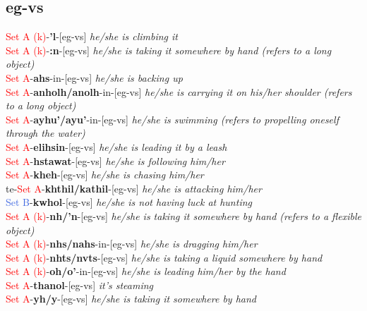 \documentclass[oneside,openany]{book}%
\begin{document}
\subsection*{eg-vs}%
\textcolor{Red}{Set A (k)}{-}\textbf{'l}{-}[eg-vs] \textit{ he/she is climbing it} \\%
\textcolor{Red}{Set A (k)}{-}\textbf{:n}{-}[eg-vs] \textit{ he/she is taking it somewhere by hand (refers to a long object)} \\%
\textcolor{Red}{Set A}{-}\textbf{ahs}{-}in{-}[eg-vs] \textit{ he/she is backing up} \\%
\textcolor{Red}{Set A}{-}\textbf{anholh/anolh}{-}in{-}[eg-vs] \textit{ he/she is carrying it on his/her shoulder (refers to a long object)} \\%
\textcolor{Red}{Set A}{-}\textbf{ayhu'/ayu'}{-}in{-}[eg-vs] \textit{ he/she is swimming (refers to propelling oneself through the water)} \\%
\textcolor{Red}{Set A}{-}\textbf{elihsin}{-}[eg-vs] \textit{ he/she is leading it by a leash} \\%
\textcolor{Red}{Set A}{-}\textbf{hstawat}{-}[eg-vs] \textit{ he/she is following him/her} \\%
\textcolor{Red}{Set A}{-}\textbf{kheh}{-}[eg-vs] \textit{ he/she is chasing him/her} \\%
te{-}\textcolor{Red}{Set A}{-}\textbf{khthil/kathil}{-}[eg-vs] \textit{ he/she is attacking him/her} \\%
\textcolor{RoyalBlue}{Set B}{-}\textbf{kwhol}{-}[eg-vs] \textit{ he/she is not having luck at hunting} \\%
\textcolor{Red}{Set A (k)}{-}\textbf{nh/'n}{-}[eg-vs] \textit{ he/she is taking it somewhere by hand (refers to a flexible object)} \\%
\textcolor{Red}{Set A (k)}{-}\textbf{nhs/nahs}{-}in{-}[eg-vs] \textit{ he/she is dragging him/her} \\%
\textcolor{Red}{Set A (k)}{-}\textbf{nhts/nvts}{-}[eg-vs] \textit{ he/she is taking a liquid somewhere by hand} \\%
\textcolor{Red}{Set A (k)}{-}\textbf{oh/o'}{-}in{-}[eg-vs] \textit{ he/she is leading him/her by the hand} \\%
\textcolor{Red}{Set A}{-}\textbf{thanol}{-}[eg-vs] \textit{ it's steaming} \\%
\textcolor{Red}{Set A}{-}\textbf{yh/y}{-}[eg-vs] \textit{ he/she is taking it somewhere by hand} \\%
\vspace{1em}%
\needspace{1in}%
\end{document}
